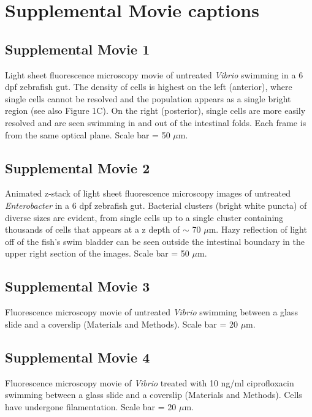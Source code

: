 {{{{{{{{{%
\newpage

\section{Supplemental Movie captions}

\subsection*{Supplemental Movie 1} 
Light sheet fluorescence microscopy movie of untreated \textit{Vibrio} swimming in a 6 dpf zebrafish gut. The density of cells is highest on the left (anterior), where single cells cannot be resolved and the population appears as a single bright region (see also Figure 1C). On the right (posterior), single cells are more easily resolved and are seen swimming in and out of the intestinal folds. Each frame is from the same optical plane. Scale bar = 50 $\mu$m.

\subsection*{Supplemental Movie 2} 
Animated z-stack of light sheet fluorescence microscopy images of untreated \textit{Enterobacter} in a 6 dpf zebrafish gut. Bacterial clusters (bright white puncta) of diverse sizes are evident, from single cells up to a single cluster containing thousands of cells that appears at a z depth of $\sim$ 70 $\mu$m. Hazy reflection of light off of the fish's swim bladder can be seen outside the intestinal boundary in the upper right section of the images. Scale bar = 50 $\mu$m.

\subsection*{Supplemental Movie 3}
Fluorescence microscopy movie of untreated \textit{Vibrio} swimming between a glass slide and a coverslip (Materials and Methods). Scale bar = 20 $\mu$m.

\subsection*{Supplemental Movie 4}
Fluorescence microscopy movie of \textit{Vibrio} treated with 10 ng/ml ciprofloxacin swimming between a glass slide and a coverslip (Materials and Methods). Cells have undergone filamentation. Scale bar = 20 $\mu$m.

}}}}}}}}}
